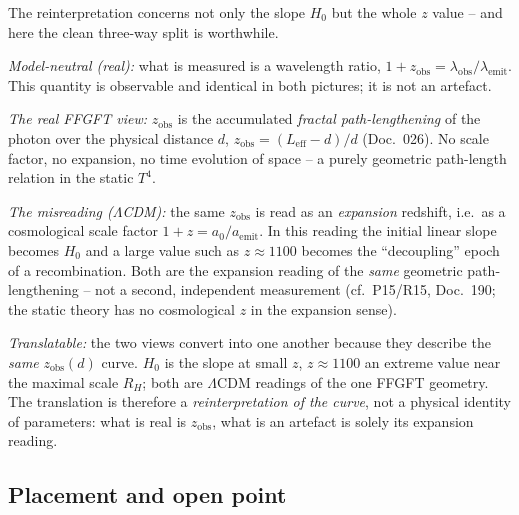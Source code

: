 The reinterpretation concerns not only the slope $H_0$ but the whole $z$
value -- and here the clean three-way split is worthwhile.

\emph{Model-neutral (real):} what is measured is a wavelength ratio,
$1+z_{\text{obs}} = \lambda_{\text{obs}}/\lambda_{\text{emit}}$. This quantity
is observable and identical in both pictures; it is not an artefact.

\emph{The real FFGFT view:} $z_{\text{obs}}$ is the accumulated \emph{fractal
path-lengthening} of the photon over the physical distance $d$,
$z_{\text{obs}} = (L_{\text{eff}}-d)/d$ (Doc.~026). No scale factor, no
expansion, no time evolution of space -- a purely geometric path-length
relation in the static $T^4$.

\emph{The misreading ($\Lambda$CDM):} the same $z_{\text{obs}}$ is read as an
\emph{expansion} redshift, i.e.\ as a cosmological scale factor
$1+z = a_0/a_{\text{emit}}$. In this reading the initial linear slope becomes
$H_0$ and a large value such as $z\approx 1100$ becomes the
\enquote{decoupling} epoch of a recombination. Both are the expansion reading
of the \emph{same} geometric path-lengthening -- not a second, independent
measurement (cf.\ P15/R15, Doc.~190; the static theory has no cosmological $z$
in the expansion sense).

\emph{Translatable:} the two views convert into one another because they
describe the \emph{same} $z_{\text{obs}}(d)$ curve. $H_0$ is the slope at small
$z$, $z\approx 1100$ an extreme value near the maximal scale $R_H$; both are
$\Lambda$CDM readings of the one FFGFT geometry. The translation is therefore
a \emph{reinterpretation of the curve}, not a physical identity of parameters:
what is real is $z_{\text{obs}}$, what is an artefact is solely its expansion
reading.

\subsection*{Placement and open point}

